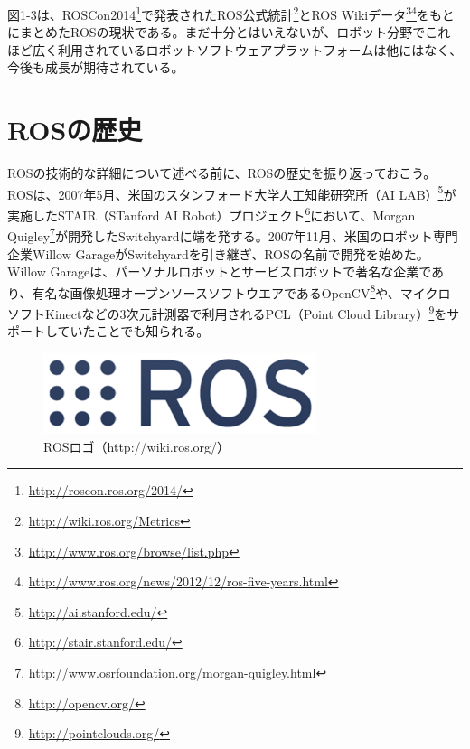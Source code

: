 図1-3は、ROSCon2014\footnote{\url{http://roscon.ros.org/2014/}}で発表されたROS公式統計\footnote{\url{http://wiki.ros.org/Metrics}}とROS Wikiデータ\footnote{\url{http://www.ros.org/browse/list.php}}\footnote{\url{http://www.ros.org/news/2012/12/ros-five-years.html}}をもとにまとめたROSの現状である。まだ十分とはいえないが、ロボット分野でこれほど広く利用されているロボットソフトウェアプラットフォームは他にはなく、今後も成長が期待されている。

\section{ROSの歴史}

ROSの技術的な詳細について述べる前に、ROSの歴史を振り返っておこう。 ROSは、2007年5月、米国のスタンフォード大学人工知能研究所（AI LAB）\footnote{\url{http://ai.stanford.edu/}}が実施したSTAIR（STanford AI Robot）プロジェクト\footnote{\url{http://stair.stanford.edu/}}において、Morgan Quigley\footnote{\url{http://www.osrfoundation.org/morgan-quigley.html}}が開発したSwitchyardに端を発する。2007年11月、米国のロボット専門企業Willow GarageがSwitchyardを引き継ぎ、ROSの名前で開発を始めた。Willow Garageは、パーソナルロボットとサービスロボットで著名な企業であり、有名な画像処理オープンソースソフトウエアであるOpenCV\footnote{\url{http://opencv.org/}}や、マイクロソフトKinectなどの3次元計測器で利用されるPCL（Point Cloud Library）\footnote{\url{http://pointclouds.org/}}をサポートしていたことでも知られる。

\begin{figure}[h]
  \centering
  \includegraphics[width=8cm]{pictures/chapter1/pic_01_04.png}
  \caption{ROSロゴ（http://wiki.ros.org/）}
\end{figure}

